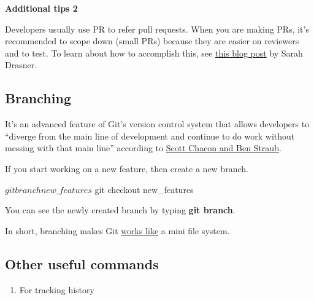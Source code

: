 \documentclass[
]{book}
\newenvironment{Shaded}{\begin{snugshade}}{\end{snugshade}}
\newcommand{\AttributeTok}[1]{\textcolor[rgb]{0.77,0.63,0.00}{#1}}
\newcommand{\CommentTok}[1]{\textcolor[rgb]{0.56,0.35,0.01}{\textit{#1}}}
\newcommand{\ExtensionTok}[1]{#1}
\newcommand{\NormalTok}[1]{#1}
\newcommand{\OperatorTok}[1]{\textcolor[rgb]{0.81,0.36,0.00}{\textbf{#1}}}
\providecommand{\tightlist}{%
  \setlength{\itemsep}{0pt}\setlength{\parskip}{0pt}}
\begin{document}
\textbf{Additional tips 2}

Developers usually use PR to refer pull requests. When you are making PRs, it's recommended to scope down (small PRs) because they are easier on reviewers and to test. To learn about how to accomplish this, see \href{https://www.netlify.com/blog/2020/03/31/how-to-scope-down-prs/}{this blog post} by Sarah Drasner.

\hypertarget{branching}{%
\subsection{Branching}\label{branching}}

It's an advanced feature of Git's version control system that allows developers to ``diverge from the main line of development and continue to do work without messing with that main line'' according to \href{https://git-scm.com/book/en/v1/Git-Branching}{Scott Chacon and Ben Straub}.

If you start working on a new feature, then create a new branch.

\begin{Shaded}
\begin{Highlighting}[]
\ExtensionTok{$}\NormalTok{ git branch new\_features}
\ExtensionTok{$}\NormalTok{ git checkout new\_features}
\end{Highlighting}
\end{Shaded}

You can see the newly created branch by typing \textbf{git branch}.

In short, branching makes Git \href{https://git-scm.com/book/en/v2/Getting-Started-Git-Basics}{works like} a mini file system.

\hypertarget{other-useful-commands}{%
\subsection{Other useful commands}\label{other-useful-commands}}

\begin{enumerate}
\def\labelenumi{\arabic{enumi}.}
\tightlist
\item
  For tracking history
\end{enumerate}

\begin{Shaded}
\end{Shaded}
\end{document}
